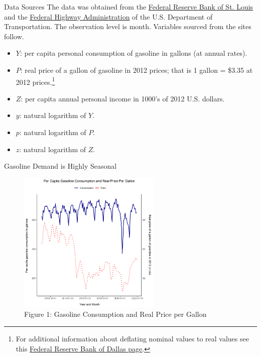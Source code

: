 \documentclass[pdf]{beamer}
\theoremstyle{remark}
\theoremstyle{definition}
\begin{document}
\begin{frame}[t]{Data Sources}
The data was obtained from the \href{https://fred.stlouisfed.org/}{Federal Reserve Bank of St. Louis} and the \href{https://highways.dot.gov/}{Federal Highway Administration} of the U.S. Department of Transportation. The observation level is month. Variables sourced from the sites follow.\\
\vspace{0.5ex}
\small
\begin{itemize}
\item $Y$: per capita personal consumption of gasoline in gallons (at annual rates).
\item $P$: real price of a gallon of gasoline in 2012 prices; that is 1 gallon = \$3.35 at 2012 prices.\footnote{For additional information about deflating nominal values to real values see this \href{https://www.dallasfed.org/research/basics/nominal.aspx}{Federal Reserve Bank of Dallas page}.}
\item $Z$:  per capita annual personal income in 1000's of 2012 U.S. dollars.
\item $y$:  natural logarithm of $Y$.
\item $p$:  natural logarithm of $P$.
\item $z$:  natural logarithm of $Z$. 
\end{itemize}
\end{frame}

\begin{frame}[t]{Gasoline Demand is Highly Seasonal}
\begin{figure}[htbp]
  \captionsetup{justification=centering}
  \includegraphics[height=6.8cm, trim=0.0cm 0.0cm 0.0cm 0.0cm width=6.8cm]{../BUSA_603_Gas_Demand/Data_621_A1/a1_q1a.png}
  \caption{Figure {\color{franklinblue} 1}: Gasoline Consumption and Real Price per Gallon}
\end{figure}
\end{frame}
\end{document}
